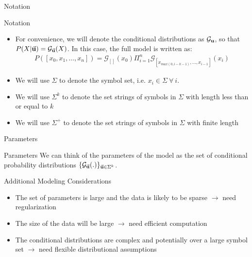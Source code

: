 \documentclass{beamer}
\newcommand{\G}{\mathcal{G}}
\newcommand{\bu}{{\bf u}}
\begin{document}
\begin{frame}[t]{Notation}
	\begin{block}{Notation}
		\begin{itemize}
			\item {For convenience, we will denote the conditional distributions as $\G_\bu$, so that $P(X | \vec \bu) =  \G_{\vec \bu}(X)$.  In this case, the full model is written as:
						\begin{eqnarray*}
							P([x_0, x_1, \ldots, x_n]) = \G_{[]}(x_0) \Pi_{i = 1}^n \G_{[x_{max(0, i-k-1)}, \ldots, x_{i-1}]}(x_i)  
						\end{eqnarray*}
			}
		 	\item We will use $\Sigma$ to denote the symbol set, i.e. $x_i \in \Sigma \ \forall \ i$.
			\item We will use $\Sigma^k$ to denote the set strings of symbols in $\Sigma$ with length less than or equal to $k$
			\item We will use $\Sigma^+$ to denote the set strings of symbols in $\Sigma$ with finite length
		\end{itemize}
	\end{block}
	
\end{frame}

\begin{frame}[t]{Parameters}
	\begin{block}{Parameters}
		We can think of the parameters of the model as the set of conditional probability distributions $\{\G_{\vec \bu} (.)\}_{\vec \bu \in \Sigma^k}$. 
	\end{block}
	
	\begin{block}{Additional Modeling Considerations}
		\begin{itemize}
			\item The set of parameters is large and the data is likely to be sparse $\rightarrow$ need regularization
			\item The size of the data will be large $\rightarrow$ need efficient computation
			\item The conditional distributions are complex and potentially over a large symbol set $\rightarrow$ need flexible distributional assumptions
		\end{itemize}
	\end{block}
\end{frame}
\end{document}
